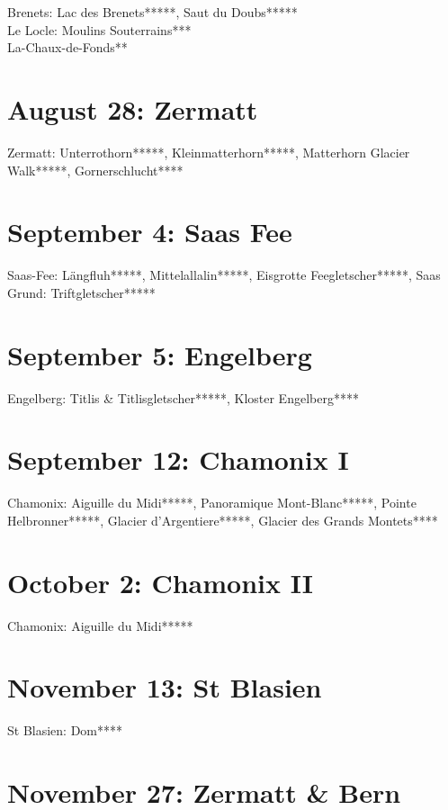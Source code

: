 Brenets: Lac des Brenets*****, Saut du Doubs*****\\
Le Locle: Moulins Souterrains***\\
La-Chaux-de-Fonds**

\section{August 28: Zermatt}
\label{Zermatt2010}

Zermatt: Unterrothorn*****, Kleinmatterhorn*****, Matterhorn Glacier Walk*****, Gornerschlucht****

\section{September 4: Saas Fee}
\label{2010SaasFee}

Saas-Fee: L\"angfluh*****, Mittelallalin*****, Eisgrotte Feegletscher*****, Saas Grund: Triftgletscher*****

\section{September 5: Engelberg}
\label{2010Titlis}

Engelberg: Titlis \& Titlisgletscher*****, Kloster Engelberg****

\section{September 12: Chamonix I}
\label{2010ChamonixI}

Chamonix: Aiguille du Midi*****, Panoramique Mont-Blanc*****, Pointe Helbronner*****, Glacier d'Argentiere*****, Glacier des Grands Montets****

\section{October 2: Chamonix II}
\label{2010ChamonixII}

Chamonix: Aiguille du Midi*****

\section{November 13: St Blasien}
\label{2010StBlasien}

St Blasien: Dom****

\section{November 27: Zermatt \& Bern}
\label{2010ZermattBern}

